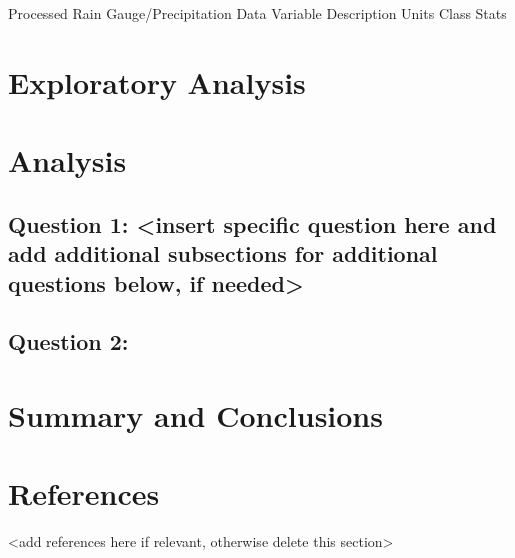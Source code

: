 \documentclass[
  12pt,
]{article}
\begin{document}
Processed Rain Gauge/Precipitation Data Variable \textbar{} Description
\textbar{} Units \textbar{} Class \textbar{} Stats

\newpage

\hypertarget{exploratory-analysis}{%
\section{Exploratory Analysis}\label{exploratory-analysis}}

\newpage

\hypertarget{analysis}{%
\section{Analysis}\label{analysis}}

\hypertarget{question-1-insert-specific-question-here-and-add-additional-subsections-for-additional-questions-below-if-needed}{%
\subsection{Question 1: \textless insert specific question here and add
additional subsections for additional questions below, if
needed\textgreater{}}\label{question-1-insert-specific-question-here-and-add-additional-subsections-for-additional-questions-below-if-needed}}

\hypertarget{question-2}{%
\subsection{Question 2:}\label{question-2}}

\newpage

\hypertarget{summary-and-conclusions}{%
\section{Summary and Conclusions}\label{summary-and-conclusions}}

\newpage

\hypertarget{references}{%
\section{References}\label{references}}

\textless add references here if relevant, otherwise delete this
section\textgreater{}
\end{document}
